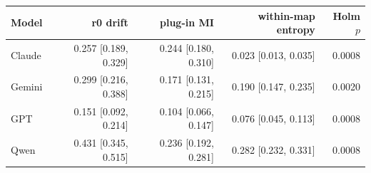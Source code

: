 \begin{tabular}{lrrrr}
\toprule
Model &
\shortstack{r0 drift\\\relax [95\% CI]} &
\shortstack{plug-in MI\\\relax [95\% CI]} &
\shortstack{within-map entropy\\\relax [95\% CI]} &
Holm $p$ \\
\midrule
Claude & 0.257 [0.189, 0.329] & 0.244 [0.180, 0.310] & 0.023 [0.013, 0.035] & 0.0008 \\
Gemini & 0.299 [0.216, 0.388] & 0.171 [0.131, 0.215] & 0.190 [0.147, 0.235] & 0.0020 \\
GPT & 0.151 [0.092, 0.214] & 0.104 [0.066, 0.147] & 0.076 [0.045, 0.113] & 0.0008 \\
Qwen & 0.431 [0.345, 0.515] & 0.236 [0.192, 0.281] & 0.282 [0.232, 0.331] & 0.0008 \\
\bottomrule
\end{tabular}
